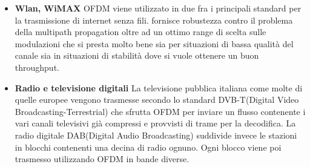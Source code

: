 \begin{itemize}
\begin{itemize}
\end{itemize}
\begin{itemize}
	\item \textbf{Wlan, WiMAX}
	  OFDM viene utilizzato in due fra i principali standard per la trasmissione di internet senza fili. fornisce robustezza contro il problema della multipath propagation oltre ad un ottimo range di scelta sulle modulazioni che si presta molto bene sia per situazioni di bassa qualità del canale sia in situazioni di stabilità dove si vuole ottenere un buon throughput.
\end{itemize}
\begin{itemize}
	\item \textbf{Radio e televisione digitali} La televisione pubblica italiana come molte di quelle europee vengono trasmesse secondo lo standard DVB-T(Digital Video Broadcasting-Terrestrial) che sfrutta OFDM per inviare un flusso contenente i vari canali televisivi già compressi e provvisti di trame per la decodifica. La radio digitale DAB(Digital Audio Broadcasting) suddivide invece le stazioni in blocchi contenenti una decina di radio ognuno. Ogni blocco viene poi trasmesso utilizzando OFDM in bande diverse.
\end{itemize}


\end{itemize}
